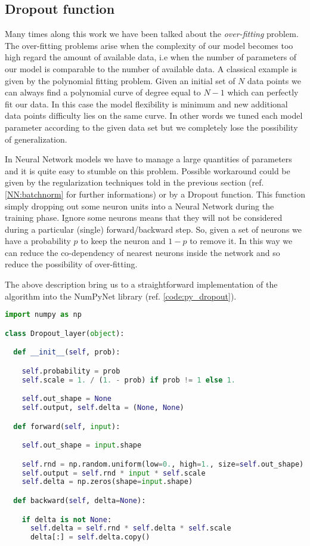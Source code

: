 \documentclass{standalone}
\begin{document}
\subsection[Dropout function]{Dropout function}\label{NN:dropout}

Many times along this work we have been talked about the \emph{over-fitting} problem.
The over-fitting problems arise when the complexity of our model becomes too high regard the amount of available data, i.e when the number of parameters of our model is comparable to the number of available data.
A classical example is given by the polynomial fitting problem.
Given an initial set of $N$ data points we can always find a polynomial curve of degree equal to $N-1$ which can perfectly fit our data.
In this case the model flexibility is minimum and new additional data points difficulty lies on the same curve.
In other words we tuned each model parameter according to the given data set but we completely lose the possibility of generalization.

In Neural Network models we have to manage a large quantities of parameters and it is quite easy to stumble on this problem.
Possible workaround could be given by the regularization techniques told in the previous section (ref. \ref{NN:batchnorm} for further informations) or by a Dropout function.
This function simply dropping out some neuron units into a Neural Network during the training phase.
Ignore some neurons means that they will not be considered during a particular (single) forward/backward step.
So, given a set of neurons we have a probability $p$ to keep the neuron and $1-p$ to remove it.
In this way we can reduce the co-dependency of nearest neurons inside the network and so reduce the possibility of over-fitting.

The above description bring us to a straightforward implementation of the algorithm into the \textsf{NumPyNet} library (ref. \ref{code:py_dropout}).

\lstset{style=snippet}
\begin{lstlisting}[language=Python, caption=NumPyNet version of Dropout function, label=code:py_dropout]
import numpy as np

class Dropout_layer(object):

  def __init__(self, prob):

    self.probability = prob
    self.scale = 1. / (1. - prob) if prob != 1 else 1.

    self.out_shape = None
    self.output, self.delta = (None, None)

  def forward(self, input):

    self.out_shape = input.shape

    self.rnd = np.random.uniform(low=0., high=1., size=self.out_shape) < self.probability
    self.output = self.rnd * input * self.scale
    self.delta = np.zeros(shape=input.shape)

  def backward(self, delta=None):

    if delta is not None:
      self.delta = self.rnd * self.delta * self.scale
      delta[:] = self.delta.copy()

\end{lstlisting}
\end{document}
